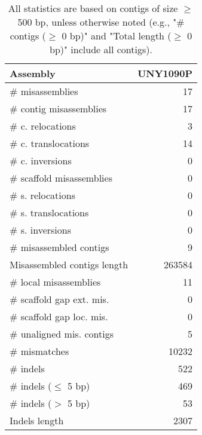 \documentclass[12pt,a4paper]{article}
\begin{document}
\begin{table}[ht]
\begin{center}
\caption{All statistics are based on contigs of size $\geq$ 500 bp, unless otherwise noted (e.g., "\# contigs ($\geq$ 0 bp)" and "Total length ($\geq$ 0 bp)" include all contigs).}
\begin{tabular}{|l*{1}{|r}|}
\hline
Assembly & UNY1090P \\ \hline
\# misassemblies & 17 \\ \hline
\hspace{2mm}\# contig misassemblies & 17 \\ \hline
\hspace{5mm}\# c. relocations & 3 \\ \hline
\hspace{5mm}\# c. translocations & 14 \\ \hline
\hspace{5mm}\# c. inversions & 0 \\ \hline
\hspace{2mm}\# scaffold misassemblies & 0 \\ \hline
\hspace{5mm}\# s. relocations & 0 \\ \hline
\hspace{5mm}\# s. translocations & 0 \\ \hline
\hspace{5mm}\# s. inversions & 0 \\ \hline
\# misassembled contigs & 9 \\ \hline
Misassembled contigs length & 263584 \\ \hline
\# local misassemblies & 11 \\ \hline
\# scaffold gap ext. mis. & 0 \\ \hline
\# scaffold gap loc. mis. & 0 \\ \hline
\# unaligned mis. contigs & 5 \\ \hline
\# mismatches & 10232 \\ \hline
\# indels & 522 \\ \hline
\hspace{5mm}\# indels ($\leq$ 5 bp) & 469 \\ \hline
\hspace{5mm}\# indels ($>$ 5 bp) & 53 \\ \hline
Indels length & 2307 \\ \hline
\end{tabular}
\end{center}
\end{table}
\end{document}

